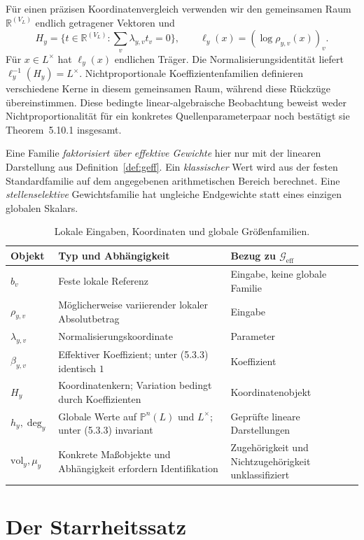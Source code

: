 \documentclass[11pt,a4paper]{article}
\theoremstyle{definition}
\theoremstyle{remark}
\newcommand{\Geff}{\mathcal{G}_{\mathrm{eff}}}
\begin{document}
Für einen präzisen Koordinatenvergleich verwenden wir den gemeinsamen Raum
$\mathbb R^{(V_L)}$ endlich getragener Vektoren und
\[
H_y=\{t\in\mathbb R^{(V_L)}:\sum_v\lambda_{y,v}t_v=0\},
\qquad \ell_y(x)=(\log\rho_{y,v}(x))_v.
\]
Für $x\in L^\times$ hat $\ell_y(x)$ endlichen Träger.
Die Normalisierungsidentität liefert $\ell_y^{-1}(H_y)=L^\times$.
Nichtproportionale Koeffizientenfamilien definieren verschiedene Kerne in
diesem gemeinsamen Raum, während diese Rückzüge übereinstimmen.
Diese bedingte linear-algebraische Beobachtung beweist weder
Nichtproportionalität für ein konkretes Quellenparameterpaar noch bestätigt
sie Theorem~5.10.1 insgesamt.

Eine Familie \emph{faktorisiert über effektive Gewichte} hier nur mit der
linearen Darstellung aus Definition~\ref{def:geff}.
Ein \emph{klassischer} Wert wird aus der festen Standardfamilie auf dem
angegebenen arithmetischen Bereich berechnet. Eine
\emph{stellenselektive} Gewichtsfamilie hat ungleiche Endgewichte statt
eines einzigen globalen Skalars.

\begin{table}[htbp]
\centering\small
\caption{Lokale Eingaben, Koordinaten und globale Größenfamilien.}\label{tab:type_glossary}
\begin{tabularx}{\textwidth}{@{}lXX@{}}
\toprule
Objekt & Typ und Abhängigkeit & Bezug zu $\Geff$\\
\midrule
$b_v$ & Feste lokale Referenz & Eingabe, keine globale Familie\\
$\rho_{y,v}$ & Möglicherweise variierender lokaler Absolutbetrag & Eingabe\\
$\lambda_{y,v}$ & Normalisierungskoordinate & Parameter\\
$\beta_{y,v}$ & Effektiver Koeffizient; unter (5.3.3) identisch $1$ & Koeffizient\\
$H_y$ & Koordinatenkern; Variation bedingt durch Koeffizienten & Koordinatenobjekt\\
$h_y,\deg_y$ & Globale Werte auf $\mathbb P^n(L)$ und $L^\times$; unter (5.3.3) invariant & Geprüfte lineare Darstellungen\\
$\mathrm{vol}_y,\mu_y$ & Konkrete Maßobjekte und Abhängigkeit erfordern Identifikation & Zugehörigkeit und Nichtzugehörigkeit unklassifiziert\\
\bottomrule
\end{tabularx}
\end{table}

\section{Der Starrheitssatz}\label{sec:rigidity}
\end{document}
